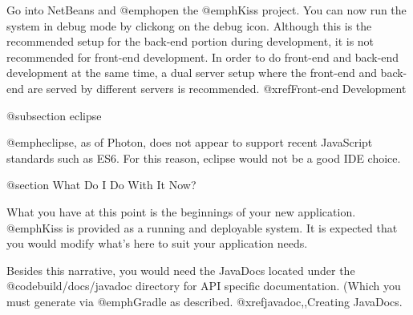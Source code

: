 Go into NetBeans and @emph{open} the @emph{Kiss} project.  You can now run the system in debug mode by clickong on the debug icon.
Although this is the recommended setup for the back-end portion during development, it is not recommended
for front-end development.  In order to do front-end and back-end development at the same time, a dual server setup where
the front-end and back-end are served by different servers is recommended.  @xref{Front-end Development}



@subsection eclipse

@emph{eclipse}, as of Photon, does not appear to support recent JavaScript standards such as ES6.  For this reason, eclipse would not be
a good IDE choice.

@section What Do I Do With It Now?

What you have at this point is the beginnings of your new application.
@emph{Kiss} is provided as a running and deployable system.  It is
expected that you would modify what's here to suit your application
needs.

Besides this narrative, you would need the JavaDocs located under the
@code{build/docs/javadoc} directory for API specific documentation.
(Which you must generate via @emph{Gradle} as described. @xref{javadoc,,Creating JavaDocs}.
